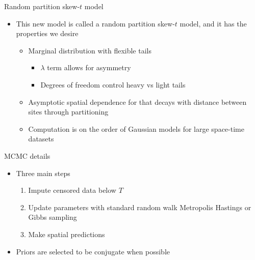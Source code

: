 \documentclass{beamer}
\begin{document}
\begin{frame}{Random partition skew-$t$ model}
  \begin{itemize} \setlength{\itemsep}{0.5em}
    \item This new model is called a random partition skew-$t$ model, and it has the properties we desire
    \begin{itemize}
      \item Marginal distribution with flexible tails
      \begin{itemize}
        \item $\lambda$ term allows for asymmetry
        \item Degrees of freedom control heavy vs light tails
      \end{itemize}
      \item Asymptotic spatial dependence for that decays with distance between sites through partitioning
      \item Computation is on the order of Gaussian models for large space-time datasets
    \end{itemize}
  \end{itemize}
\end{frame}




\begin{frame}{MCMC details}
  \begin{itemize} \setlength{\itemsep}{0.5em}
    \item Three main steps
    \begin{enumerate}[1.]
      \item Impute censored data below $T$
      \item Update parameters with standard random walk Metropolis Hastings or Gibbs sampling
      \item Make spatial predictions
    \end{enumerate}
    \item Priors are selected to be conjugate when possible
  \end{itemize}
\end{frame}
\end{document}
